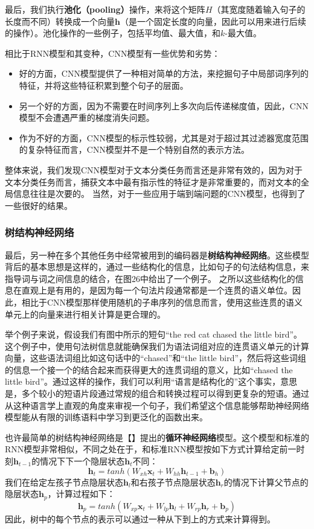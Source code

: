 \documentclass[10pt,a4paper]{ctexart}
\begin{document}
最后，我们执行\textbf{池化（pooling）}操作，来将这个矩阵$H$（其宽度随着输入句子的长度而不同）转换成一个向量$\textbf{h}$（是一个固定长度的向量，因此可以用来进行后续的操作）。池化操作的一些例子，包括平均值、最大值，和$k$-最大值。

相比于RNN模型和其变种，CNN模型有一些优势和劣势：
\begin{itemize}
\item 好的方面，CNN模型提供了一种相对简单的方法，来挖掘句子中局部词序列的特征，并将这些特征积累到整个句子的层面。
\item 另一个好的方面，因为不需要在时间序列上多次向后传递梯度值，因此，CNN模型不会遭遇严重的梯度消失问题。
\item 作为不好的方面，CNN模型的标示性较弱，尤其是对于超过其过滤器宽度范围的复杂特征而言，CNN模型并不是一个特别自然的表示方法。
\end{itemize}

整体来说，我们发现CNN模型对于文本分类任务而言还是非常有效的，因为对于文本分类任务而言，捕获文本中最有指示性的特征才是非常重要的，而对文本的全局信息往往是次要的。
当然，对于一些应用于端到端问题的CNN模型，也得到了一些很好的结果。

\subsubsection{树结构神经网络}
最后，另一种在多个其他任务中经常被用到的编码器是\textbf{树结构神经网络}。这些模型背后的基本思想是这样的，通过一些结构化的信息，比如句子的句法结构信息，来指导词与词之间信息的结合，在图26中给出了一个例子。
之所以这些结构化的信息在直观上是有用的，是因为每一个句法片段通常都是一个连贯的语义单位。因此，相比于CNN模型那样使用随机的子串序列的信息而言，使用这些连贯的语义单元上的向量来进行相关计算是更合理的。

举个例子来说，假设我们有图中所示的短句“the red cat chased the little bird”。这个例子中，使用句法树信息就能确保我们为语法词组对应的连贯语义单元的计算向量，这些语法词组比如这句话中的“chased”和“the little bird”，然后将这些词组的信息一个接一个的结合起来而获得更大的连贯词组的意义，比如“chased the little bird”。通过这样的操作，我们可以利用“语言是结构化的”这个事实，意思是，多个较小的短语片段通过常规的组合和转换过程可以得到更复杂的短语。通过从这种语言学上直观的角度来审视一个句子，我们希望这个信息能够帮助神经网络模型能从有限的训练语料中学习到更泛化的函数出来。

也许最简单的树结构神经网络是【】提出的\textbf{循环神经网络}模型。这个模型和标准的RNN模型非常相似，不同之处在于，和标准RNN模型按如下方式计算给定前一时刻$\textbf{h}_{t-1}$的情况下下一个隐层状态$\textbf{h}_t$不同：
\[
 \textbf{h}_t = tanh(W_{xh}\textbf{x}_t + W_{hh}\textbf{h}_{t-1} + \textbf{b}_h)
\]
我们在给定左孩子节点隐层状态$\textbf{h}_l$和右孩子节点隐层状态$\textbf{h}_r$的情况下计算父节点的隐层状态$\textbf{h}_p$，计算过程如下：
\[
 \textbf{h}_p = tanh(W_{xp}\textbf{x}_t + W_{lp}\textbf{h}_l + W_{rp}\textbf{h}_r + \textbf{b}_p)
\]
因此，树中的每个节点的表示可以通过一种从下到上的方式来计算得到。
\end{document}
